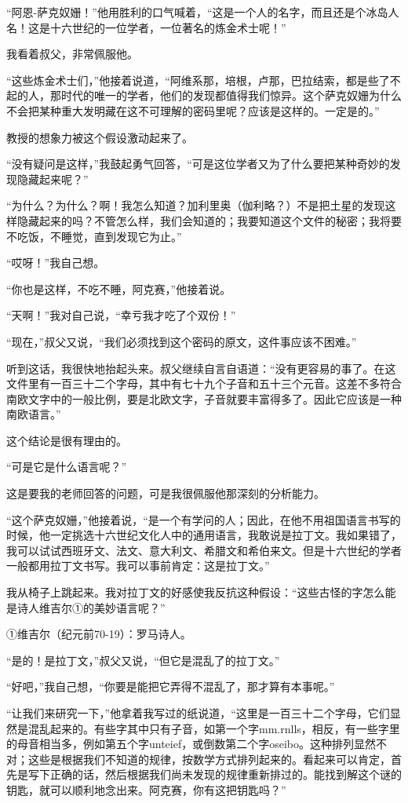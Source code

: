 \documentclass[10pt]{book}
\begin{document}
“阿恩-萨克奴姗！”他用胜利的口气喊着，“这是一个人的名字，而且还是个冰岛人名！这是十六世纪的一位学者，一位著名的炼金术士呢！”

我看着叔父，非常佩服他。

“这些炼金术士们，”他接着说道，“阿维系那，培根，卢那，巴拉结索，都是些了不起的人，那时代的唯一的学者，他们的发现都值得我们惊异。这个萨克奴姗为什么不会把某种重大发明藏在这不可理解的密码里呢？应该是这样的。一定是的。”

教授的想象力被这个假设激动起来了。

“没有疑问是这样，”我鼓起勇气回答，“可是这位学者又为了什么要把某种奇妙的发现隐藏起来呢？”

“为什么？为什么？啊！我怎么知道？加利里奥（伽利略？）不是把土星的发现这样隐藏起来的吗？不管怎么样，我们会知道的；我要知道这个文件的秘密；我将要不吃饭，不睡觉，直到发现它为止。”

“哎呀！”我自己想。

“你也是这样，不吃不睡，阿克赛，”他接着说。

“天啊！”我对自己说，“幸亏我才吃了个双份！”

“现在，”叔父又说，“我们必须找到这个密码的原文，这件事应该不困难。”

听到这话，我很快地抬起头来。叔父继续自言自语道：“没有更容易的事了。在这文件里有一百三十二个字母，其中有七十九个子音和五十三个元音。这差不多符合南欧文字中的一般比例，要是北欧文字，子音就要丰富得多了。因此它应该是一种南欧语言。”

这个结论是很有理由的。

“可是它是什么语言呢？”

这是要我的老师回答的问题，可是我很佩服他那深刻的分析能力。

“这个萨克奴姗，”他接着说，“是一个有学问的人；因此，在他不用祖国语言书写的时候，他一定挑选十六世纪文化人中的通用语言，我敢说是拉丁文。我如果错了，我可以试试西班牙文、法文、意大利文、希腊文和希伯来文。但是十六世纪的学者一般都用拉丁文书写。我可以事前肯定：这是拉丁文。”

我从椅子上跳起来。我对拉丁文的好感使我反抗这种假设：“这些古怪的字怎么能是诗人维吉尔①的美妙语言呢？”

①维吉尔（纪元前70-19）：罗马诗人。

“是的！是拉丁文，”叔父又说，“但它是混乱了的拉丁文。”

“好吧，”我自己想，“你要是能把它弄得不混乱了，那才算有本事呢。”

“让我们来研究一下，”他拿着我写过的纸说道，“这里是一百三十二个字母，它们显然是混乱起来的。有些字其中只有子音，如第一个字mm.rnlls，相反，有一些字里的母音相当多，例如第五个字unteief，或倒数第二个字oseibo。这种排列显然不对；这些是根据我们不知道的规律，按数学方式排列起来的。看起来可以肯定，首先是写下正确的话，然后根据我们尚未发现的规律重新排过的。能找到解这个谜的钥匙，就可以顺利地念出来。阿克赛，你有这把钥匙吗？”
\end{document}
